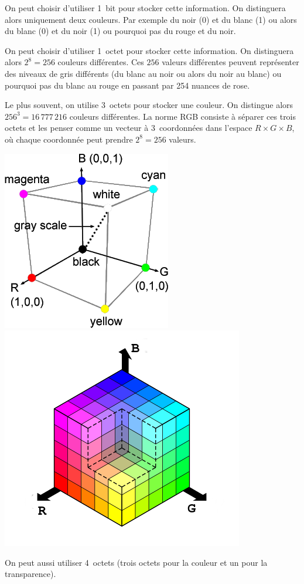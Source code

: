 \documentclass[10pt,fleqn]{article} %
\begin{document}
\begin{multicols}{2}
On peut choisir d'utiliser 1~bit pour stocker cette
information. On distinguera alors uniquement deux couleurs. Par
exemple du noir (0) et du blanc (1) ou alors du blanc (0) et du noir
(1) ou pourquoi pas du rouge et du noir. 

On peut choisir d'utiliser 1~octet pour stocker cette information. On
distinguera alors $2^8=256$ couleurs différentes. Ces $256$ valeurs
différentes peuvent représenter des niveaux de gris différents (du
blanc au noir ou alors du noir au blanc) ou pourquoi pas du blanc au
rouge en passant par 254 nuances de rose.

Le plus souvent, on utilise 3~octets pour stocker une couleur. On distingue
alors $256^3 = 16\,777\,216$ couleurs différentes. La norme RGB consiste à
séparer ces trois octets et les penser comme
 un vecteur à 3~coordonnées dans l'espace
$R\times G \times B$, où chaque coordonnée peut prendre $2^8=256$
valeurs. 

\begin{center}
  \includegraphics[width=.2\textwidth]{images/theme_image_1_fig_1}
  \includegraphics[width=.2\textwidth]{images/theme_image_1_fig_2}
\end{center}



On peut aussi utiliser 4~octets (trois octets pour la couleur et un
pour la transparence).


\end{multicols}
\end{document}
